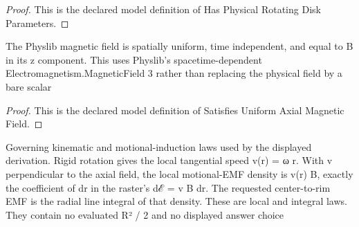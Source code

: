 \begin{proof}
  This is the declared model definition of Has Physical Rotating Disk Parameters.
\end{proof}
\begin{definition}
  \label{def:physics:phyx-mini-0920:phyxminiproblems-problemphyxmini0920-satisfiesuniformaxialmagneticfield}
  The Physlib magnetic field is spatially uniform, time independent, and equal to B in its z component. This uses Physlib's spacetime-dependent Electromagnetism.MagneticField 3 rather than replacing the physical field by a bare scalar
\end{definition}
\begin{proof}
  This is the declared model definition of Satisfies Uniform Axial Magnetic Field.
\end{proof}
\begin{definition}
  \label{def:physics:phyx-mini-0920:phyxminiproblems-problemphyxmini0920-satisfiesrotatingdiskmotionalemflaws}
  Governing kinematic and motional-induction laws used by the displayed derivation. Rigid rotation gives the local tangential speed v(r) = ω r. With v perpendicular to the axial field, the local motional-EMF density is v(r) B, exactly the coefficient of dr in the raster's dℰ = v B dr. The requested center-to-rim EMF is the radial line integral of that density. These are local and integral laws. They contain no evaluated R² / 2 and no displayed answer choice
\end{definition}
